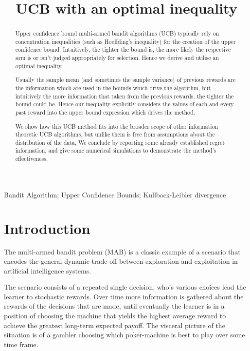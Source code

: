 \documentclass[12pt]{colt2020} %
\title[UCB with an optimal inequality]{UCB with an optimal inequality}
\begin{document}
\maketitle

\begin{abstract}%
Upper confidence bound multi-armed bandit algorithms (UCB) typically rely on concentration inequalities (such as Hoeffding's inequality) for the creation of the upper confidence bound.
Intuitively, the tighter the bound is, the more likely the respective arm is or isn't judged appropriately for selection.
Hence we derive and utilise an optimal inequality.

Usually the sample mean (and sometimes the sample variance) of previous rewards are the information which are used in the bounds which drive the algorithm, but intuitively the more information that taken from the previous rewards, the tighter the bound could be.
Hence our inequality explicitly considers the values of each and every past reward into the upper bound expression which drives the method.

We show how this UCB method fits into the broader scope of other information theoretic UCB algorithms, but unlike them is free from assumptions about the distribution of the data, 
We conclude by reporting some already established regret information, and give some numerical simulations to demonstrate the method's effectiveness.
\end{abstract}

\begin{keywords}%
Bandit Algorithm; Upper Confidence Bounds; Kullback-Leibler divergence%
\end{keywords}

\section{Introduction}

The multi-armed bandit problem (MAB) is a classic example of a scenario that encodes the general dynamic trade-off between exploration and exploitation in artificial intelligence systems.

The scenario consists of a repeated single decision, who's various choices lead the learner to stochastic rewards.
Over time more information is gathered about the rewards of the decisions that are made, until eventually the learner is in a position of choosing the machine that yields the highest average reward to achieve the greatest long-term expected payoff.
The visceral picture of the situation is of a gambler choosing which poker-machine is best to play over some time frame.
\end{document}
